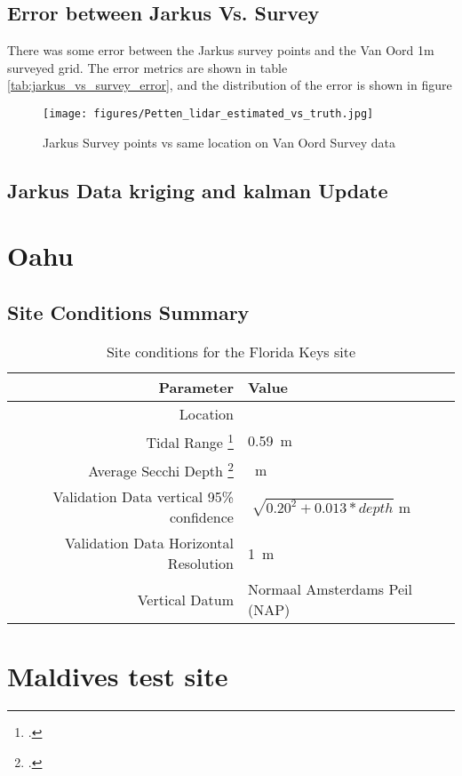 \subsection{Error between Jarkus Vs. Survey}
There was some error between the Jarkus survey points and the Van Oord 1m surveyed grid. The error metrics are shown in table \ref{tab:jarkus_vs_survey_error}, and the distribution of the error is shown in figure

\begin{figure}[h!]
    \centering
    \texttt{[image: figures/Petten\_lidar\_estimated\_vs\_truth.jpg]}
    \caption{Jarkus Survey points vs same location on Van Oord Survey data}
    \label{fig:jarkus_vs_survey}
\end{figure}

\subsection{Jarkus Data kriging and kalman Update}

\section{Oahu}

\subsection{Site Conditions Summary}
\begin{table}[htbp]
    \begin{minipage}{0.5\textwidth}
        \centering\begin{tabular}{r l }
            Parameter                                                 & \textbf{Value}                              \\
            \hline
            Location                                                  &                                             \\
            Tidal Range \footcite{tidal_data_reanalysis2022}          & \qty{0.59}{m}                               \\
            Average Secchi Depth \footcite{ACRI-STGlobColourTeam2020} & \qty{}{m}                                   \\
            Validation Data vertical 95\% confidence                  &  $\sqrt[]{0.20^2 + 0.013 * depth}$ m \\
            Validation Data Horizontal Resolution                     & \qty{1}{m}                                  \\
            Vertical Datum                                            & Normaal Amsterdams Peil (NAP)               \\
        \end{tabular}
    \end{minipage}
    \caption{Site conditions for the Florida Keys site}
    \label{table:Oahusitestats}
\end{table}

\section{Maldives test site}